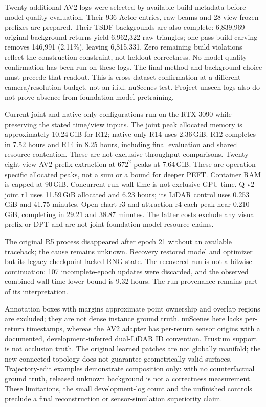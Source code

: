 \documentclass[10pt,a4paper]{article}
\begin{document}
Twenty additional AV2 logs were selected by available build metadata before
model quality evaluation. Their 936 Actor entries, raw beams and 28-view
frozen prefixes are prepared. Their TSDF backgrounds are also complete:
6,839,969 original background returns yield 6,962,322 raw triangles; one-pass
build carving removes 146,991 (2.11\%), leaving 6,815,331. Zero remaining build
violations reflect the construction constraint, not heldout correctness.
No model-quality confirmation has been run on these logs. The final method
and background choice must precede that readout. This is cross-dataset
confirmation at a different camera/resolution budget, not an i.i.d. nuScenes
test. Project-unseen logs also do not prove absence from foundation-model
pretraining.

Current joint and native-only configurations run on the RTX 3090 while
preserving the stated time/view inputs. The joint peak allocated memory is approximately
10.24\,GiB for R12; native-only R14 uses 2.36\,GiB. R12 completes in
7.52 hours and R14 in 8.25 hours, including final evaluation and shared
resource contention. These are not exclusive-throughput comparisons. Twenty-eight-view
AV2 prefix extraction at $672^2$ peaks at 7.64\,GiB. These are operation-specific
allocated peaks, not a sum or a bound for deeper PEFT. Container RAM is capped
at 90\,GiB. Concurrent run wall time is not exclusive GPU time.
Q-v2 joint r1 uses 11.59\,GiB allocated and 6.23 hours; its LiDAR control
uses 0.253\,GiB and 41.75 minutes. Open-chart r3 and attraction r4 each peak
near 0.210\,GiB, completing in 29.21 and 38.87 minutes. The latter costs exclude
any visual prefix or DPT and are not joint-foundation-model resource claims.

The original R5 process disappeared after epoch 21 without an available
traceback; the cause remains unknown. Recovery restored model and optimizer
but its legacy checkpoint lacked RNG state. The recovered run is not a
bitwise continuation: 107 incomplete-epoch updates were discarded, and the
observed combined wall-time lower bound is 9.32 hours. The run provenance
remains part of its interpretation.

Annotation boxes with margins approximate point ownership and overlap regions
are excluded; they are not dense instance ground truth. nuScenes here lacks
per-return timestamps, whereas the AV2 adapter has per-return sensor origins
with a documented, development-inferred dual-LiDAR ID convention. Frustum
support is not occlusion truth. The original learned patches are not globally
manifold; the new connected topology does not guarantee geometrically valid surfaces.
Trajectory-edit examples demonstrate composition only: with no counterfactual
ground truth, released unknown background is not a correctness measurement.
These limitations, the small development-log count and the unfinished controls
preclude a final reconstruction or sensor-simulation superiority claim.
\end{document}
